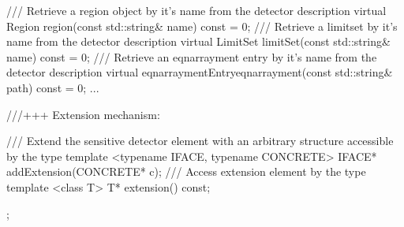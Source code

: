 \documentclass[10pt,a4paper]{article}
\begin{document}
\begin{code}
{  /// Retrieve a region object by it's name from the detector description
  virtual Region        region(const std::string& name)    const = 0;
  /// Retrieve a limitset by it's name from the detector description
  virtual LimitSet      limitSet(const std::string& name)      const = 0;
  /// Retrieve an eqnarrayment entry by it's name from the detector description
  virtual eqnarraymentEntryeqnarrayment(const std::string& path)     const = 0;
  ...
  
  ///+++ Extension mechanism:

  /// Extend the sensitive detector element with an arbitrary structure accessible by the type
  template <typename IFACE, typename CONCRETE> IFACE* addExtension(CONCRETE* c);
  /// Access extension element by the type
  template <class T> T* extension() const;
};
\end{code}
\end{document}

